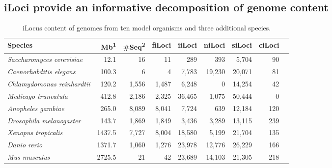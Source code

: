 \subsection*{iLoci provide an informative decomposition of genome content}

\begin{table}[t]
\caption{iLocus content of genomes from ten model organisms and three additional species.}
\label{Table:iLocusCountsModOrg}
\begin{tabularx}{\textwidth}{lrrrrrrrr}
\hline
                            Species &  Mb\textsuperscript{1} &  \#Seq\textsuperscript{2} &       fiLoci &       iiLoci &       niLoci &       siLoci &       ciLoci   \\ \hline
\textit{Saccharomyces cerevisiae}   &                   12.1 &                        16 &           11 &          289 &          393 &        5,704 &           90   \\
\textit{Caenorhabditis elegans}     &                  100.3 &                         6 &            4 &        7,783 &       19,230 &       20,071 &           81   \\
\textit{Chlamydomonas reinhardtii}  &                  120.2 &                     1,556 &        1,487 &        6,248 &            0 &       14,254 &           42   \\
\textit{Medicago truncatula}        &                  412.8 &                     2,186 &        2,325 &       36,465 &        1,075 &       50,444 &            0   \\
\textit{Anopheles gambiae}          &                  265.0 &                     8,089 &        8,041 &        7,724 &          639 &       12,184 &          120   \\
\textit{Drosophila melanogaster}    &                  143.7 &                     1,869 &        1,849 &        3,436 &        3,289 &       13,115 &          239   \\
\textit{Xenopus tropicalis}         &                 1437.5 &                     7,727 &        8,004 &       18,580 &        5,199 &       21,704 &          135   \\
\textit{Danio rerio}                &                 1371.7 &                     1,060 &        1,276 &       23,978 &       12,776 &       26,229 &          166   \\
\textit{Mus musculus}               &                 2725.5 &                        21 &           42 &       23,689 &       14,103 &       21,305 &          218   \\

\end{tabularx}
\end{table}
